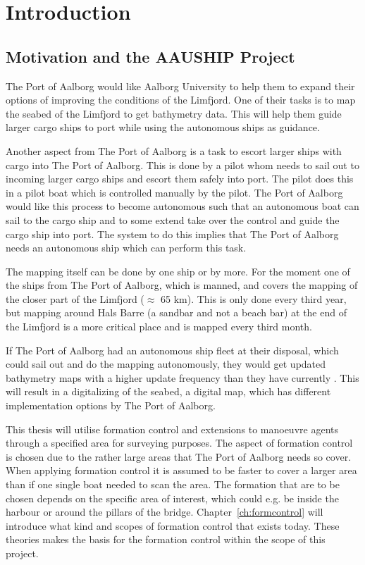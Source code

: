 \chapter{Introduction}

\section{Motivation and the AAUSHIP Project}
The Port of Aalborg would like Aalborg University to help them to expand their options of improving the conditions of the Limfjord. One of their tasks is to map the seabed of the Limfjord to get bathymetry data. This will help them guide larger cargo ships to port while using the autonomous ships as guidance.

Another aspect from The Port of Aalborg is a task to escort larger ships with cargo into The Port of Aalborg. This is done by a pilot whom needs to sail out to incoming larger cargo ships and escort them safely into port. The pilot does this in a pilot boat which is controlled manually by the pilot. The Port of Aalborg would like this process to become autonomous such that an autonomous boat can sail to the cargo ship and to some extend take over the control and guide the cargo ship into port. The system to do this implies that The Port of Aalborg needs an autonomous ship which can perform this task.

The mapping itself can be done by one ship or by more. For the moment one of the ships from The Port of Aalborg, which is manned, and covers the mapping of the closer part of the Limfjord ($\approx$ 65 km). This is only done every third year, but mapping around Hals Barre (a sandbar and not a beach bar) at the end of the Limfjord is a more critical place and is mapped every third month.

If The Port of Aalborg had an autonomous ship fleet at their disposal, which could sail out and do the mapping autonomously, they would get updated bathymetry maps with a higher update frequency than they have currently \citep{portofaalborg}. This will result in a digitalizing of the seabed, a digital map, which has different implementation options by The Port of Aalborg.

This thesis will utilise formation control and extensions to manoeuvre agents through a specified area for surveying purposes. The aspect of formation control is chosen due to the rather large areas that The Port of Aalborg needs so cover. When applying formation control it is assumed to be faster to cover a larger area than if one single boat needed to scan the area. The formation that are to be chosen depends on the specific area of interest, which could e.g. be inside the harbour or around the pillars of the bridge. Chapter~\vref{ch:formcontrol} will introduce what kind and scopes of formation control that exists today. These theories makes the basis for the formation control within the scope of this project.

